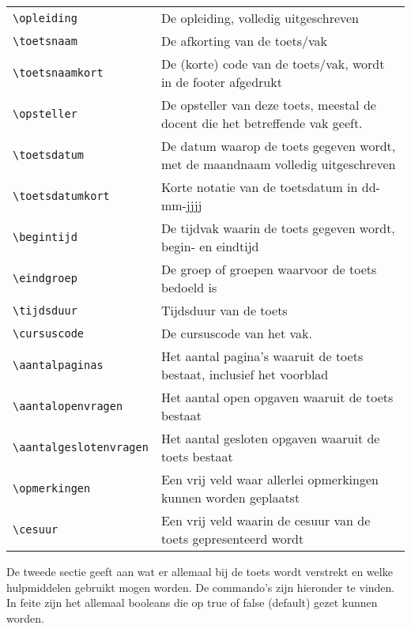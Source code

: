 \documentclass[12pt,dutch,addpoints,fleqn]{tisdexam}
\begin{document}
\begin{tabular}{lp{11.9cm}}
\verb|\opleiding| & De opleiding, volledig uitgeschreven\\ 
\verb|\toetsnaam| & De afkorting van de toets/vak \\
\verb|\toetsnaamkort| & De (korte) code van de toets/vak, wordt in de footer afgedrukt \\ 
\verb|\opsteller| & De opsteller van deze toets, meestal de docent die het betreffende vak geeft. \\
\verb|\toetsdatum| & De datum waarop de toets gegeven wordt, met de maandnaam volledig uitgeschreven \\ 
\verb|\toetsdatumkort| & Korte notatie van de toetsdatum in dd-mm-jjjj \\
\verb|\begintijd|       & De tijdvak waarin de toets gegeven wordt, begin- en eindtijd \\
\verb|\eindgroep|     & De groep of groepen waarvoor de toets bedoeld is \\ 
\verb|\tijdsduur| & Tijdsduur van de toets \\
\verb|\cursuscode|    & De cursuscode van het vak. \\
\verb|\aantalpaginas| & Het aantal pagina's waaruit de toets bestaat, inclusief het voorblad \\
\verb|\aantalopenvragen| & Het aantal open opgaven waaruit de toets bestaat \\
\verb|\aantalgeslotenvragen| & Het aantal gesloten opgaven waaruit de toets bestaat \\
\verb|\opmerkingen| & Een vrij veld waar allerlei opmerkingen kunnen worden geplaatst \\
\verb|\cesuur| & Een vrij veld waarin de cesuur van de toets gepresenteerd wordt \\
\end{tabular}

\bigskip
De tweede sectie geeft aan wat er allemaal bij de toets wordt verstrekt en welke hulpmiddelen gebruikt
mogen worden. De commando's zijn hieronder te vinden. In feite zijn het allemaal booleans die op true
of false (default) gezet kunnen worden.
\end{document}
